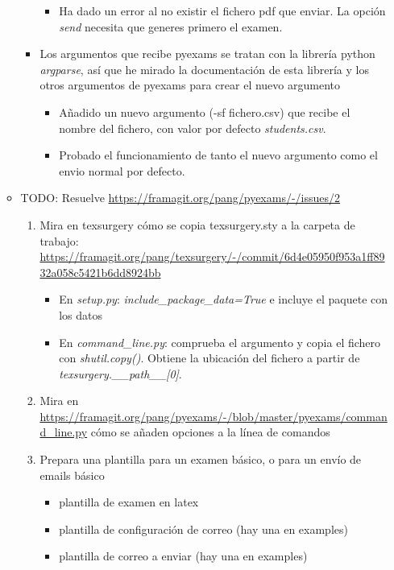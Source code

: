 \begin{itemize}
\begin{itemize}
\begin{itemize}
\begin{itemize}
                \item Ha dado un error al no existir el fichero pdf que enviar. La opción \textit{send} necesita que generes primero el examen.
            \end{itemize}
            \item Los argumentos que recibe pyexams se tratan con la librería python \textit{argparse}, así que he mirado la documentación de esta librería y los otros argumentos de pyexams para crear el nuevo argumento
            \begin{itemize}
                \item Añadido un nuevo argumento (-sf fichero.csv) que recibe el nombre del fichero, con valor por defecto \textit{students.csv}.
                \item Probado el funcionamiento de tanto el nuevo argumento como el envio normal por defecto.
            \end{itemize}
        \end{itemize}
        \item TODO: Resuelve \url{https://framagit.org/pang/pyexams/-/issues/2}
        \begin{enumerate}
            \item Mira en texsurgery cómo se copia texsurgery.sty a la carpeta de trabajo: \url{https://framagit.org/pang/texsurgery/-/commit/6d4e05950f953a1ff8932a058c5421b6dd8924bb}
            \begin{itemize}
                \item En \textit{setup.py}: \textit{include\_package\_data=True} e incluye el paquete con los datos
                \item En \textit{command\_line.py}: comprueba el argumento y copia el fichero con \textit{shutil.copy()}. Obtiene la ubicación del fichero a partir de \textit{texsurgery.\_\_path\_\_[0]}.
            \end{itemize}
            \item Mira en \url{https://framagit.org/pang/pyexams/-/blob/master/pyexams/command_line.py} cómo se añaden opciones a la línea de comandos
            \item Prepara una plantilla para un examen básico, o para un envío de emails básico
            \begin{itemize}
                \item plantilla de examen en latex
                \item plantilla de configuración de correo (hay una en examples)
                \item plantilla de correo a enviar (hay una en examples)

\end{itemize}
\end{enumerate}
\end{itemize}
\end{itemize}
